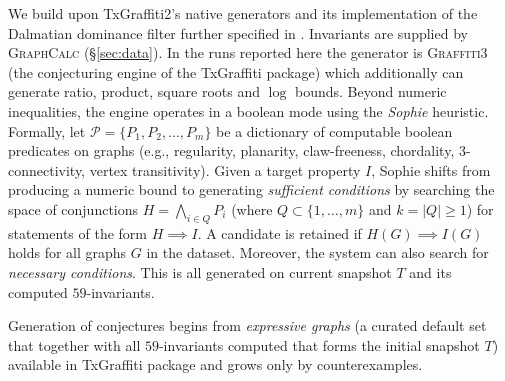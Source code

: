 \documentclass[]{ceurart}
\begin{document}
We build upon TxGraffiti2's native generators and its implementation of the Dalmatian dominance filter further specified in \cite{davila2024automated,davila2026graffiti3}. Invariants
are supplied by \textsc{GraphCalc} (\S\ref{sec:data}). In the runs reported here the generator is
\textsc{Graffiti3}~\cite{davila2026graffiti3} (the conjecturing
engine of the TxGraffiti package) which additionally can generate ratio,
product, square roots and $\log$ bounds. Beyond numeric inequalities, the engine operates in a boolean mode using the \emph{Sophie} heuristic. Formally, let $\mathcal{P} = \{P_1, P_2, \dots, P_m\}$ be a dictionary of computable boolean predicates on graphs (e.g., regularity, planarity, claw-freeness, chordality, $3$-connectivity, vertex transitivity). Given a target property $I$, Sophie shifts from producing a numeric bound to generating \emph{sufficient conditions} by searching the space of conjunctions $H = \bigwedge_{i \in Q} P_i$ (where $Q \subset \{1, \dots, m\}$ and $k = |Q| \ge 1$) for statements of the form $H \implies I$. A candidate is retained if $H(G) \implies I(G)$ holds for all graphs $G$ in the dataset. Moreover, the system can also search for \emph{necessary conditions}. This is all generated on current snapshot $T$ and its computed $59$-invariants. 

Generation of conjectures begins from \emph{expressive graphs} (a curated default set that together with all $59$-invariants computed that forms the initial snapshot $T$) available in TxGraffiti package and grows only by counterexamples.
\end{document}

